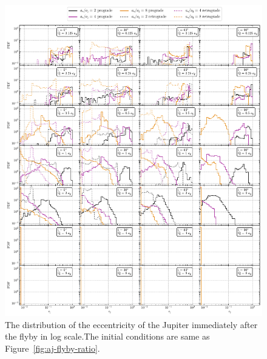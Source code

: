 \documentclass[twocolumn]{aastex63}
\newcommand*\fgr[1]{Figure~\ref{#1}}
\begin{document}
\begin{figure}
    \includegraphics[width=\textwidth]{figs/ej-flyby-ratio.pdf}
    \caption{The distribution of the eccentricity of the Jupiter immediately after the flyby in log scale.The initial conditions are same as \fgr{fig:aj-flyby-ratio}.} 
    \label{fig:ej-flyby-ratio}
\end{figure}
\end{document}
